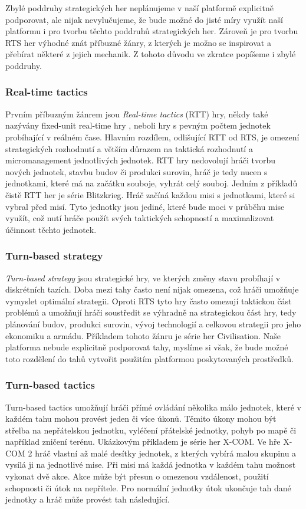 Zbylé poddruhy strategických her neplánujeme v naší platformě explicitně podporovat, ale nijak nevylučujeme, že bude možné do jisté míry využít naší platformu i pro tvorbu těchto poddruhů strategických her. Zároveň je pro tvorbu RTS her výhodné znát příbuzné žánry, z kterých je možno se inspirovat a přebírat některé z jejich mechanik. Z tohoto důvodu ve zkratce popíšeme i zbylé poddruhy.

\subsubsection{Real-time tactics}
Prvním příbuzným žánrem jsou \emph{Real-time tactics} (RTT) hry, někdy také nazývány fixed-unit real-time hry \citep{site:stratg02}, neboli hry s pevným počtem jednotek probíhající v reálném čase. Hlavním rozdílem, odlišující RTT od RTS, je omezení  strategických rozhodnutí a větším důrazem na taktická rozhodnutí a micromanagement jednotlivých jednotek. RTT hry nedovolují hráči tvorbu nových jednotek, stavbu budov či produkci surovin, hráč je tedy nucen s jednotkami, které má na začátku souboje, vyhrát celý souboj.  Jedním z příkladů čistě RTT her je série Blitzkrieg. Hráč začíná každou misi s jednotkami, které si vybral před misí. Tyto jednotky jsou jediné, které bude moci v průběhu mise využít, což nutí hráče použít svých taktických schopností a maximalizovat účinnost těchto jednotek. 

\subsubsection{Turn-based strategy}
\emph{Turn-based strategy} jsou strategické hry, ve kterých změny stavu probíhají v diskrétních tazích. Doba mezi tahy často není nijak omezena, což hráči umožňuje vymyslet optimální strategii. Oproti RTS tyto hry často omezují taktickou část problémů a umožňují hráči soustředit se výhradně na strategickou část hry, tedy plánování budov, produkci surovin, vývoj technologií a celkovou strategii pro jeho ekonomiku a armádu. Příkladem tohoto žánru je série her Civilisation\citep{site:civ5}.  Naše platforma nebude explicitně podporovat tahy, myslíme si však, že bude možné toto rozdělení do tahů vytvořit použitím platformou poskytovaných prostředků.

\subsubsection{Turn-based tactics}
Turn-based tactics umožňují hráči přímé ovládání několika málo jednotek, které v každém tahu mohou provést jeden či více úkonů. Těmito úkony mohou být střelba na nepřátelskou jednotku, vyléčení přátelské jednotky, pohyb po mapě či například zničení terénu. Ukázkovým příkladem je série her X-COM. Ve hře X-COM 2 hráč vlastní až malé desítky jednotek, z kterých vybírá malou skupinu a vysílá ji na jednotlivé mise. Při misi má každá jednotka v každém tahu možnost vykonat dvě akce. Akce může být přesun o omezenou vzdálenost, použití schopnosti či útok na nepřítele. Pro normální jednotky útok ukončuje tah dané jednotky a hráč může provést tah následující. 

